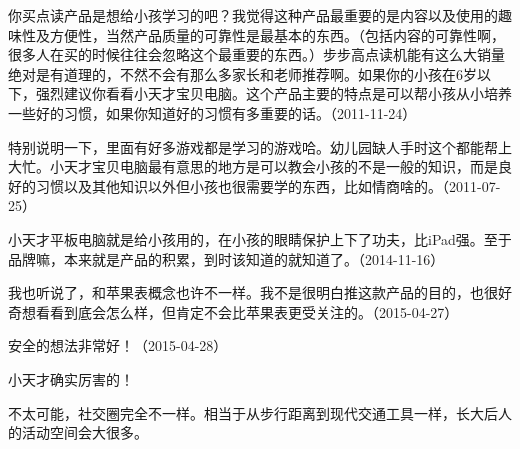 你买点读产品是想给小孩学习的吧？我觉得这种产品最重要的是内容以及使用的趣味性及方便性，当然产品质量的可靠性是最基本的东西。（包括内容的可靠性啊，很多人在买的时候往往会忽略这个最重要的东西。）步步高点读机能有这么大销量绝对是有道理的，不然不会有那么多家长和老师推荐啊。如果你的小孩在6岁以下，强烈建议你看看小天才宝贝电脑。这个产品主要的特点是可以帮小孩从小培养一些好的习惯，如果你知道好的习惯有多重要的话。（2011-11-24）


特别说明一下，里面有好多游戏都是学习的游戏哈。幼儿园缺人手时这个都能帮上大忙。小天才宝贝电脑最有意思的地方是可以教会小孩的不是一般的知识，而是良好的习惯以及其他知识以外但小孩也很需要学的东西，比如情商啥的。（2011-07-25）


小天才平板电脑就是给小孩用的，在小孩的眼睛保护上下了功夫，比iPad强。至于品牌嘛，本来就是产品的积累，到时该知道的就知道了。（2014-11-16）


我也听说了，和苹果表概念也许不一样。我不是很明白推这款产品的目的，也很好奇想看看到底会怎么样，但肯定不会比苹果表更受关注的。（2015-04-27）


安全的想法非常好！（2015-04-28）


小天才确实厉害的！


不太可能，社交圈完全不一样。相当于从步行距离到现代交通工具一样，长大后人的活动空间会大很多。


